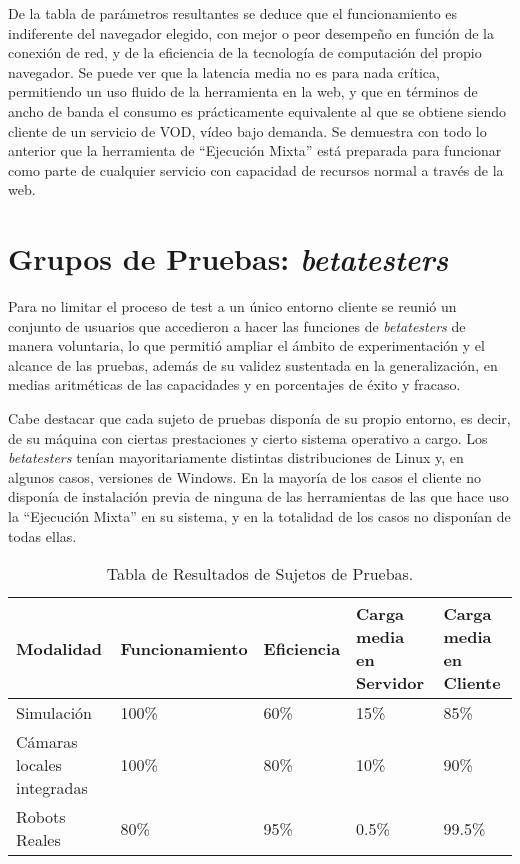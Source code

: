 De la tabla de parámetros resultantes se deduce que el funcionamiento es indiferente del navegador elegido, con mejor o peor desempeño en función de la conexión de red, y de la eficiencia de la tecnología de computación del propio navegador. Se puede ver que la latencia media no es para nada crítica, permitiendo un uso fluido de la herramienta en la web, y que en términos de ancho de banda el consumo es prácticamente equivalente al que se obtiene siendo cliente de un servicio de VOD, vídeo bajo demanda. Se demuestra con todo lo anterior que la herramienta de ``Ejecución Mixta'' está preparada para funcionar como parte de cualquier servicio con capacidad de recursos normal a través de la web.

\section{Grupos de Pruebas: \textit{betatesters}}

Para no limitar el proceso de test a un único entorno cliente se reunió un conjunto de usuarios que accedieron a hacer las funciones de \textit{betatesters} de manera voluntaria, lo que permitió ampliar el ámbito de experimentación y el alcance de las pruebas, además de su validez sustentada en la generalización, en medias aritméticas de las capacidades y en porcentajes de éxito y fracaso.

Cabe destacar que cada sujeto de pruebas disponía de su propio entorno, es decir, de su máquina con ciertas prestaciones y cierto sistema operativo a cargo. Los \textit{betatesters} tenían mayoritariamente distintas distribuciones de Linux y, en algunos casos, versiones de Windows. En la mayoría de los casos el cliente no disponía de instalación previa de ninguna de las herramientas de las que hace uso la ``Ejecución Mixta'' en su sistema, y en la totalidad de los casos no disponían de todas ellas.

\begin{table}[htbp]
\begin{center}
\begin{tabular}{| p{1.8cm}| p{2.6cm} | p{1.7cm}| p{2.4cm}| p{3cm}|}
\hline
Modalidad & Funcionamiento & Eficiencia & Carga media en Servidor & Carga media en Cliente \\
\hline \hline
Simulación & 100\% & 60\% & 15\% & 85\%\\ \hline
Cámaras locales integradas & 100\% & 80\% & 10\% & 90\%\\ \hline
Robots Reales & 80\% & 95\% & 0.5\% & 99.5\%\\ \hline
\end{tabular}
\caption{Tabla de Resultados de Sujetos de Pruebas.}
\label{tabla:pros_cons}
\end{center}
\end{table}

